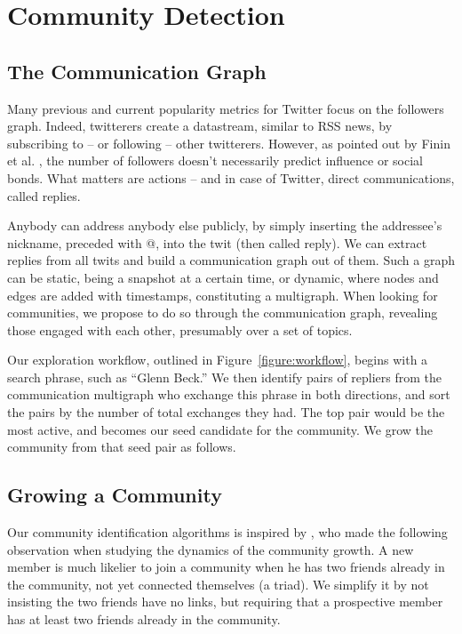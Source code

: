 \section{Community Detection}

\subsection{The Communication Graph}

Many previous and current popularity metrics for Twitter focus on the followers graph.  Indeed, twitterers create a datastream, similar to RSS news, by subscribing to -- or following -- other twitterers.  However, as pointed out by Finin et al. \cite{DBLP:conf/kdd/JavaSFT07}, the number of followers doesn’t necessarily predict influence or social bonds.  What matters are actions -- and in case of Twitter, direct communications, called replies.

Anybody can address anybody else publicly, by simply inserting the addressee’s nickname, preceded with @, into the twit (then called reply).  We can extract replies from all twits and build a communication graph out of them.  Such a graph can be static, being a snapshot at a certain time, or dynamic, where nodes and edges are added with timestamps, constituting a multigraph.  When looking for communities, we propose to do so through the communication graph, revealing those engaged with each other, presumably over a set of topics.

Our exploration workflow, outlined in Figure~\ref{figure:workflow}, begins with a search phrase, such as ``Glenn Beck.''  We then identify pairs of repliers from the communication multigraph who exchange this phrase in both directions, and sort the pairs by the number of total exchanges they had.  The top pair would be the most active, and becomes our seed candidate for the community.  We grow the community from that seed pair as follows.

\subsection{Growing a Community}

Our community identification algorithms is inspired by \cite{DBLP:conf/kdd/BackstromHKL06}, who made the following observation when studying the dynamics of the community growth.  A new member is much likelier to join a community when he has two friends already in the community, not yet connected themselves (a triad).  We simplify it by not insisting the two friends have no links, but requiring that a prospective member has at least two friends already in the community.

